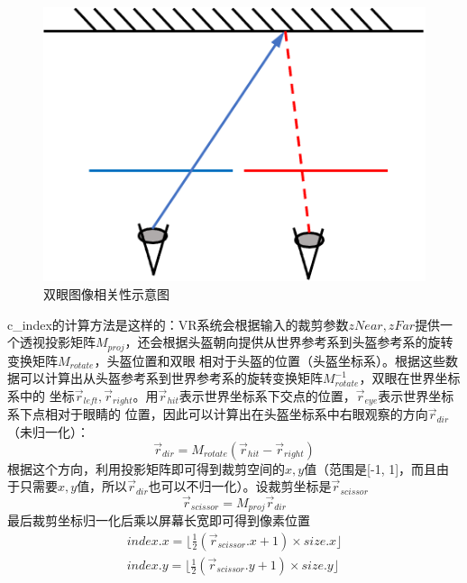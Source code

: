 \documentclass[UTF8]{ctexart}
\begin{document}
        \begin{figure}[H]
        \centering
        \includegraphics[scale=0.6]{pic/BinocularCorrelation.png}
        \caption{双眼图像相关性示意图}
        \label{fig:3}
        \end{figure}
        
        c\_index的计算方法是这样的：VR系统会根据输入的裁剪参数$zNear, zFar$提供一个透视投影矩阵$M_{proj}$，还会根据头盔朝向提供从世界参考系到头盔参考系的旋转变换矩阵$M_{rotate}$，头盔位置和双眼
        相对于头盔的位置（头盔坐标系）。根据这些数据可以计算出从头盔参考系到世界参考系的旋转变换矩阵$M^{-1}_{rotate}$，双眼在世界坐标系中的
        坐标$\overrightarrow{r}_{left}, \overrightarrow{r}_{right}$。用$\overrightarrow{r}_{hit}$表示世界坐标系下交点的位置，$\overrightarrow{r}_{eye}$表示世界坐标系下点相对于眼睛的
        位置，因此可以计算出在头盔坐标系中右眼观察的方向$\overrightarrow{r}_{dir}$（未归一化）：
        \begin{equation}
            \overrightarrow{r}_{dir}=M_{rotate}(\overrightarrow{r}_{hit}-\overrightarrow{r}_{right})
        \end{equation}
        根据这个方向，利用投影矩阵即可得到裁剪空间的$x,y$值（范围是[-1, 1]，而且由于只需要$x, y$值，所以$\overrightarrow{r}_{dir}$也可以不归一化）。设裁剪坐标是$\overrightarrow{r}_{scissor}$
        \begin{equation}
            \overrightarrow{r}_{scissor}=M_{proj}\overrightarrow{r}_{dir}
        \end{equation}
        最后裁剪坐标归一化后乘以屏幕长宽即可得到像素位置
        \begin{equation}
            \begin{array}{c}
                index.x=\lfloor\frac{1}{2}(\overrightarrow{r}_{scissor}.x+1)\times size.x\rfloor\\
                index.y=\lfloor\frac{1}{2}(\overrightarrow{r}_{scissor}.y+1)\times size.y\rfloor\\
            \end{array}
        \end{equation}
        
\end{document}
